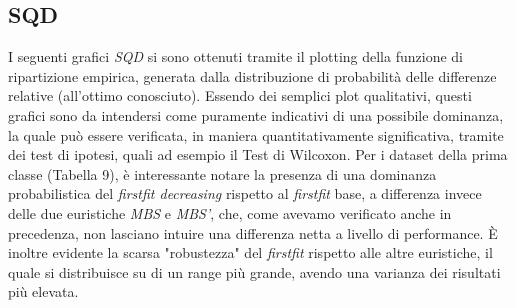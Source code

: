 \documentclass{article}
\begin{document}
\subsection{SQD}
I seguenti grafici \textit{SQD} si sono ottenuti tramite il plotting della funzione di ripartizione empirica, generata dalla distribuzione di probabilità delle differenze relative (all'ottimo conosciuto). 
\newline
\newline
Essendo dei semplici plot qualitativi, questi grafici sono da intendersi come puramente indicativi di una possibile dominanza, la quale può essere verificata, in maniera quantitativamente significativa, tramite dei test di ipotesi, quali ad esempio il  Test di Wilcoxon.
\newline
\newline
Per i dataset della prima classe (Tabella 9), è interessante notare la presenza di una dominanza probabilistica del \textit{firstfit decreasing} rispetto al \textit{firstfit} base, a differenza invece delle due euristiche \textit{MBS} e \textit{MBS'}, che, come avevamo verificato anche in precedenza, non lasciano intuire una differenza netta a livello di performance. È inoltre evidente la scarsa "robustezza" del \textit{firstfit} rispetto alle altre euristiche, il quale si distribuisce su di un range più grande, avendo una varianza dei risultati più elevata. 
\end{document}
